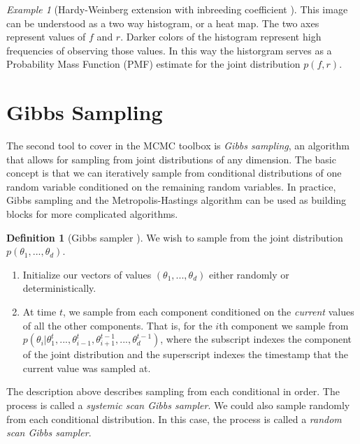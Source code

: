 \documentclass[11pt]{amsart}
\theoremstyle{theorem} %
\theoremstyle{definition}                  %
\newtheorem{defn}[thm]{Definition}
\theoremstyle{example}                       %
\theoremstyle{remark}                       %
\newtheorem{exmp}[thm]{Example}  %
\numberwithin{equation}{section}
\begin{document}
\begin{exmp}[{Hardy-Weinberg extension with inbreeding coefficient \cite{stephens}}]
    This image can be understood as a two way histogram, or a heat map. The two axes represent values of $f$ and $r$. Darker colors of the histogram represent high frequencies of observing those values. In this way the historgram serves as a Probability Mass Function (PMF) estimate for the joint distribution $p(f,r)$.
    
\end{exmp}

\section{Gibbs Sampling}

The second tool to cover in the MCMC toolbox is {\em Gibbs sampling}\cite[p.~508]{blitzstein}\cite[p.~276]{gelman}, an algorithm that allows for sampling from joint distributions of any dimension. The basic concept is that we can iteratively sample from conditional distributions of one random variable conditioned on the remaining random variables. In practice, Gibbs sampling and the Metropolis-Hastings algorithm can be used as building blocks for more complicated algorithms.

\begin{defn}[{Gibbs sampler \cite[p.~508]{blitzstein}\cite[p.~24]{mcmc}\cite[p.~276]{gelman}}]
    
    We wish to sample from the joint distribution $p(\theta_1,...,\theta_d)$.
    
    
    \begin{enumerate}
    \item Initialize our vectors of values $(\theta_1,...,\theta_d)$ either randomly or deterministically. 
    \item At time $t$, we sample from each component conditioned on the \emph{current} values of all the other components. That is, for the $i$th component we sample from $p(\theta_i|\theta_1^t,...,\theta_{i-1}^t, \theta_{i+1}^{t-1}, ..., \theta_d^{t-1})$, where the subscript indexes the component of the joint distribution and the superscript indexes the timestamp that the current value was sampled at.  
    
\end{enumerate}

The description above describes sampling from each conditional in order. The process is called a {\em systemic scan Gibbs sampler}. We could also sample randomly from each conditional distribution. In this case, the process is called a {\em random scan Gibbs sampler}.
    
\end{defn}
\end{document}
